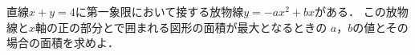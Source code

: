\documentclass[../../main.tex]{subfiles}
\begin{document}
直線$x+y=4$に第一象限において接する放物線$y=-ax^2+bx$がある．
この放物線と$x$軸の正の部分とで囲まれる図形の面積が最大となるときの
$a$，$b$の値とその場合の面積を求めよ．
\end{document}
